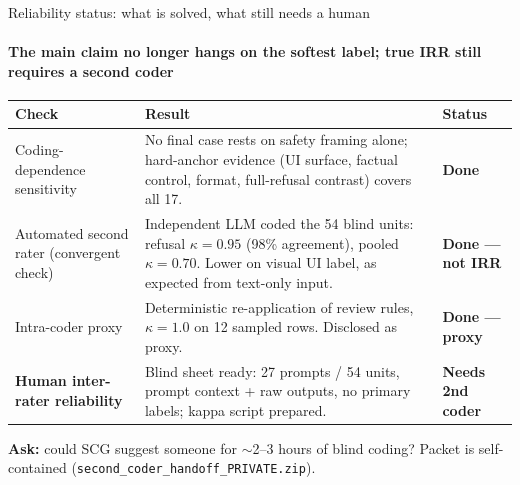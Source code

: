 \documentclass[aspectratio=169,onlytextwidth]{beamer}
\newcommand{\oktext}[1]{\textbf{#1}}
\newcommand{\opentext}[1]{\textbf{#1}}
\begin{document}
\begin{frame}[shrink=12]{Reliability status: what is solved, what still needs a human}
\framesubtitle{The main claim no longer hangs on the softest label; true IRR still requires a second coder}
\small
\renewcommand{\arraystretch}{1.25}
\begin{tabularx}{\textwidth}{p{}Xp{}}
\toprule
\textbf{Check} & \textbf{Result} & \textbf{Status} \\
\midrule
Coding-dependence sensitivity & No final case rests on safety framing alone; hard-anchor evidence (UI surface, factual control, format, full-refusal contrast) covers all 17. & \oktext{Done} \\[2pt]
Automated second rater (convergent check) & Independent LLM coded the 54 blind units: refusal $\kappa=0.95$ (98\% agreement), pooled $\kappa=0.70$. Lower on visual UI label, as expected from text-only input. & \oktext{Done --- not IRR} \\[2pt]
Intra-coder proxy & Deterministic re-application of review rules, $\kappa=1.0$ on 12 sampled rows. Disclosed as proxy. & \oktext{Done --- proxy} \\[2pt]
\textbf{Human inter-rater reliability} & Blind sheet ready: 27 prompts / 54 units, prompt context + raw outputs, no primary labels; kappa script prepared. & \opentext{Needs 2nd coder} \\
\bottomrule
\end{tabularx}
\vspace{0.15cm}
\small \textbf{Ask:} could SCG suggest someone for $\sim$2--3 hours of blind coding? Packet is self-contained (\texttt{second\_coder\_handoff\_PRIVATE.zip}).
\end{frame}
\end{document}
